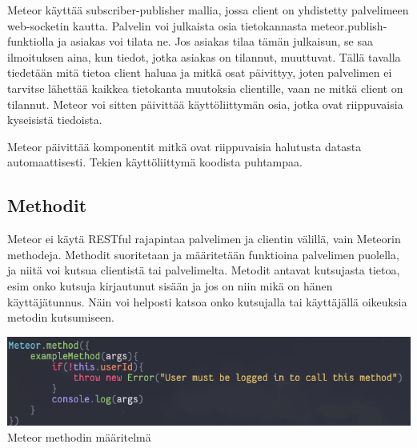 \medskip

Meteor käyttää subscriber-publisher mallia, jossa client on yhdistetty palvelimeen web-socketin kautta. 
%
Palvelin voi julkaista osia tietokannasta meteor.publish-funktiolla ja asiakas voi tilata ne. Jos asiakas tilaa tämän julkaisun, se saa ilmoituksen aina, kun tiedot, jotka asiakas on tilannut, muuttuvat.
Tällä tavalla tiedetään mitä tietoa client haluaa ja mitkä osat päivittyy, joten palvelimen ei tarvitse lähettää kaikkea tietokanta muutoksia clientille, vaan ne mitkä client on tilannut.
Meteor voi sitten päivittää käyttöliittymän osia, jotka ovat riippuvaisia kyseisistä tiedoista. 



\medskip

Meteor päivittää komponentit mitkä ovat riippuvaisia halutusta datasta automaattisesti. Tekien käyttöliittymä koodista puhtampaa.


\medskip



\subsection*{Methodit}

Meteor ei käytä RESTful rajapintaa palvelimen ja clientin välillä, vain Meteorin methodeja.
Methodit suoritetaan ja määritetään funktioina palvelimen puolella, ja niitä voi kutsua clientistä tai palvelimelta.
Metodit antavat kutsujasta tietoa, esim onko kutsuja kirjautunut sisään ja jos on niin mikä on hänen käyttäjätunnus. 
Näin voi helposti katsoa onko kutsujalla tai käyttäjällä oikeuksia metodin kutsumiseen.
\medskip



\includegraphics[width=15cm]{src/public/methodexample.png}\\
Meteor methodin määritelmä
\medskip

